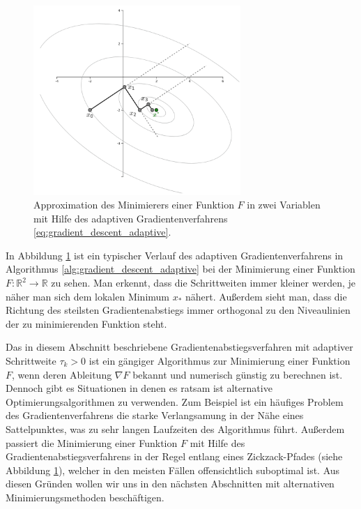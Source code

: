 \begin{figure}[tbh]
\centering
\includegraphics[width=0.7\textwidth]{./atelier/img/gradient_descent.png}
\caption{Approximation des Minimierers einer Funktion $F$ in zwei Variablen mit Hilfe des adaptiven Gradientenverfahrens \eqref{eq:gradient_descent_adaptive}.}
\label{fig:gradient_descent_adaptive}
\end{figure}
In Abbildung \ref{fig:gradient_descent_adaptive} ist ein typischer Verlauf des adaptiven Gradientenverfahrens in Algorithmus \ref{alg:gradient_descent_adaptive} bei der Minimierung einer Funktion $F \colon \mathbb{R}^2 \rightarrow \mathbb{R}$ zu sehen. 
Man erkennt, dass die Schrittweiten immer kleiner werden, je näher man sich dem lokalen Minimum $x_*$ nähert.
Außerdem sieht man, dass die Richtung des steilsten Gradientenabstiegs immer orthogonal zu den Niveaulinien der zu minimierenden Funktion steht.

\begin{remark}{}{}
Das in diesem Abschnitt beschriebene Gradientenabstiegsverfahren mit adaptiver Schrittweite $\tau_k > 0$ ist ein gängiger Algorithmus zur Minimierung einer Funktion $F$, wenn deren Ableitung $\nabla F$ bekannt und numerisch günstig zu berechnen ist. 
Dennoch gibt es Situationen in denen es ratsam ist alternative Optimierungsalgorithmen zu verwenden. 
Zum Beispiel ist ein häufiges Problem des Gradientenverfahrens die starke Verlangsamung in der Nähe eines Sattelpunktes, was zu sehr langen Laufzeiten des Algorithmus führt. 
Außerdem passiert die Minimierung einer Funktion $F$ mit Hilfe des Gradientenabstiegsverfahrens in der Regel entlang eines Zickzack-Pfades (siehe Abbildung \ref{fig:gradient_descent_adaptive}), welcher in den meisten Fällen offensichtlich suboptimal ist. 
Aus diesen Gründen wollen wir uns in den nächsten Abschnitten mit alternativen Minimierungsmethoden beschäftigen.
\end{remark}

